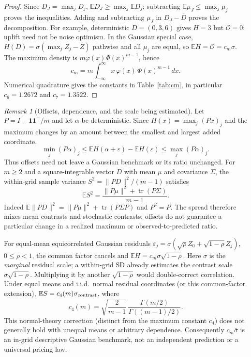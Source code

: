 \documentclass[10pt,letterpaper]{article}
\theoremstyle{remark}
\newtheorem*{remarkx}{Remark}
\begin{document}
\begin{proof}
Since $D_J=\max_jD_j$, $\mathbb ED_J\ge\max_j\mathbb ED_j$;
subtracting $\mathbb E\mu_J\le\max_j\mu_j$ proves the inequalities.
Adding and subtracting $\mu_J$ in $D_J-\bar D$ proves the decomposition.
For example, deterministic $D=(0,3,6)$ gives $H=3$ but $\mathcal O=0$:
uplift need not be noise optimism. In the Gaussian special case,
$H(D)=\sigma(\max_j Z_j-\bar Z)$ pathwise and all $\mu_j$ are equal, so
$\mathbb EH=\mathcal O=c_m\sigma$. The maximum density is
$m\varphi(x)\Phi(x)^{m-1}$, hence
\[
c_m=m\int_{-\infty}^{\infty}x\,\varphi(x)\,\Phi(x)^{m-1}\,dx.
\]
Numerical quadrature gives the constants in Table~\ref{tab:cm}, in
particular $c_6=1.2672$ and $c_7=1.3522$.
\end{proof}

\begin{remarkx}[Offsets, dependence, and the scale being estimated]
Let $P=I-\mathbf1\mathbf1^\top/m$ and let $\alpha$ be deterministic. Since
$H(x)=\max_j(Px)_j$ and the maximum changes by an amount between the
smallest and largest added coordinate,
\[
\min_j(P\alpha)_j\le
\mathbb EH(\alpha+\varepsilon)-\mathbb EH(\varepsilon)
\le\max_j(P\alpha)_j.
\]
Thus offsets need not leave a Gaussian benchmark or its ratio unchanged.
For $m\ge2$ and a square-integrable vector $D$ with mean $\mu$ and covariance
$\Sigma$, the within-grid sample variance $S^2=\|PD\|^2/(m-1)$ satisfies
\[
\mathbb ES^2=
\frac{\|P\mu\|^2+\operatorname{tr}(P\Sigma)}{m-1}.
\]
Indeed $\mathbb E\|PD\|^2=\|P\mu\|^2+
\operatorname{tr}(P\Sigma P)$ and $P^2=P$. The spread therefore mixes
mean contrasts and stochastic contrasts; offsets do not guarantee a
particular change in a realized maximum or observed-to-predicted ratio.

For equal-mean equicorrelated Gaussian residuals
$\varepsilon_j=\sigma(\sqrt\rho Z_0+\sqrt{1-\rho}Z_j)$,
$0\le\rho<1$, the common factor cancels and
$\mathbb EH=c_m\sigma\sqrt{1-\rho}$. Here $\sigma$ is the \emph{marginal}
residual scale; a within-grid SD already estimates the contrast scale
$\sigma\sqrt{1-\rho}$. Multiplying it by another $\sqrt{1-\rho}$ would
double-correct correlation. Under equal means and i.i.d.\ normal residual
coordinates (or this common-factor extension),
$\mathbb ES=c_4(m)\sigma_{\rm contrast}$, where
\[
c_4(m)=\sqrt{\frac{2}{m-1}}\,
\frac{\Gamma(m/2)}{\Gamma((m-1)/2)}.
\]
This normal-theory correction (distinct from the maximum constant $c_4$)
does not generally hold with unequal means or arbitrary dependence.
Consequently $c_m\bar\sigma$ is an in-grid descriptive Gaussian benchmark,
not an independent prediction or a universal pricing law.
\end{remarkx}
\end{document}
